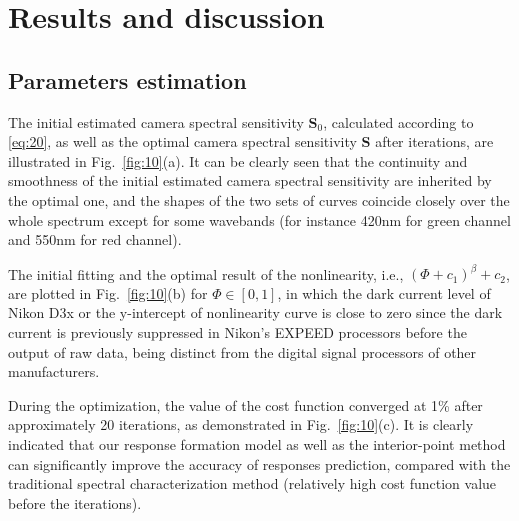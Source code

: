 \documentclass[9pt,twocolumn,twoside]{osajnl}
\begin{document}
\section{Results and discussion}\label{sec:results and discussion}

\subsection{Parameters estimation}\label{sec:parameters estimation}

The initial estimated camera spectral sensitivity $\mathbf{S}_0$, calculated according to \eqref{eq:20}, as well as the optimal camera spectral sensitivity $\mathbf{S}$ after iterations, are illustrated in Fig.~\ref{fig:10}(a). It can be clearly seen that the continuity and smoothness of the initial estimated camera spectral sensitivity are inherited by the optimal one, and the shapes of the two sets of curves coincide closely over the whole spectrum except for some wavebands (for instance 420nm for green channel and 550nm for red channel).

The initial fitting and the optimal result of the nonlinearity, i.e., $(\Phi + c_1)^\beta + c_2$, are plotted in Fig.~\ref{fig:10}(b) for $\Phi\in[0, 1]$, in which the dark current level of Nikon D3x or the y-intercept of nonlinearity curve is close to zero since the dark current is previously suppressed in Nikon’s EXPEED processors before the output of raw data, being distinct from the digital signal processors of other manufacturers.

During the optimization, the value of the cost function converged at 1\% after approximately 20 iterations, as demonstrated in Fig.~\ref{fig:10}(c). It is clearly indicated that our response formation model as well as the interior-point method can significantly improve the accuracy of responses prediction, compared with the traditional spectral characterization method (relatively high cost function value before the iterations).
\end{document}
